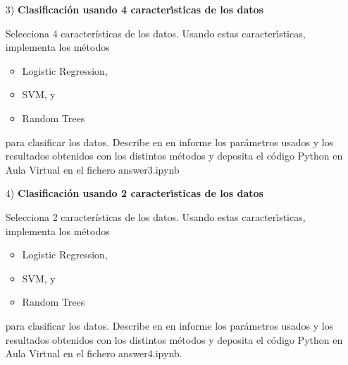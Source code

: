 \documentclass{article}
\begin{document}
\begin{itemize}

\item[3)] {\bf Clasificaci\'on usando 4 caracter\'{\i}sticas de los datos}

Selecciona 4 caracter\'isticas de los datos. Usando estas caracter\'{\i}sticas, implementa los m\'etodos 

\begin{itemize}

\item
Logistic Regression, 

\item
SVM, y

\item
Random Trees


\end{itemize}

para clasificar los datos. Describe en en informe los par\'ametros usados y los resultados obtenidos con los distintos m\'etodos y deposita el c\'odigo Python en Aula Virtual en el fichero answer3.ipynb

\end{itemize}





\begin{itemize}

\item[4)] {\bf Clasificaci\'on usando 2 caracter\'{\i}sticas de los datos}

Selecciona 2 caracter\'isticas de los datos. Usando estas caracter\'{\i}sticas, implementa los m\'etodos 

\begin{itemize}

\item
Logistic Regression, 

\item
SVM, y

\item
Random Trees

\end{itemize}

para clasificar los datos. Describe en en informe los par\'ametros usados y los resultados obtenidos con los distintos m\'etodos y deposita el c\'odigo Python en Aula Virtual en el fichero answer4.ipynb.

\end{itemize}
\end{document}

